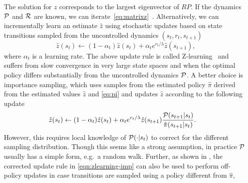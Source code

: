 The solution for $z$ corresponds to the largest eigenvector of $RP$.
If the dynamics $\mathcal{P}$ and $\mathcal{R}$ are known, we can iterate~\eqref{eq:matrixz}~\citep{Todorov2006}.
Alternatively, we can incrementally learn an estimate $\hat{z}$ using stochastic updates based on state transitions sampled from the uncontrolled dynamics $(s_t,r_t,s_{t+1})$
\[
\hat{z}(s_t) \leftarrow (1-\alpha_t)\hat{z}(s_t) + \alpha_t e^{r_t/\lambda}\hat{z}(s_{t+1}),
\]
where $\alpha_t$ is a learning rate. 
The above update rule is called Z-learning~\citep{Todorov2006} and suffers from slow convergence in very large state spaces and when the optimal policy differs substantially from the uncontrolled dynamics $\mathcal{P}$.
A better choice is importance sampling, which uses samples from the estimated policy $\hat{\pi}$ derived from the estimated values $\hat{z}$ and \eqref{eq:pi} and updates $\hat{z}$ according to the following update
\begin{align}\label{eqn:zlearning-imp}
\hat{z}(s_t) \leftarrow (1-\alpha_t)& \hat{z}(s_t) + \alpha_t e^{r_t/\lambda}\hat{z}(s_{t+1})\frac {\mathcal{P}(s_{t+1}|s_t)} {\hat{\pi}(s_{t+1}|s_t)}.
\end{align}
However, this requires local knowledge of $\mathcal{P}(\cdot|s_t)$ to correct for the different sampling distribution.
Though this seems like a strong assumption, in practice $\mathcal{P}$ usually has a simple form, e.g.~a random walk.
Further, as shown in \citet{Jonsson2016}, the corrected update rule in \eqref{eqn:zlearning-imp} can also be used to perform off-policy updates in case transitions are sampled using a policy different from $\hat{\pi}$,


